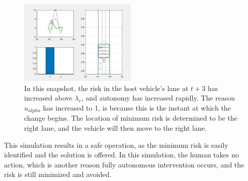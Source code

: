 \documentclass[conference]{IEEEtran}
\begin{document}
\begin{figure}[ht]
    \includegraphics[width=0.5\textwidth]{cs1b.JPG}
    \caption{In this snapshot, the risk in the host vehicle's lane at $t+3$ has increased above $\lambda_{r}$, and autonomy has increased rapidly. The reason $u_{alpha}$ has increased to 1, is because this is the instant at which the change begins. The location of minimum risk is determined to be the right lane, and the vehicle will then move to the right lane.}
    \label{fig:cs1b}
\end{figure}

This simulation results in a safe operation, as the minimum risk is easily identified and the solution is offered. In this simulation, the human takes no action, which is another reason fully autonomous intervention occurs, and the risk is still minimized and avoided.
\end{document}
